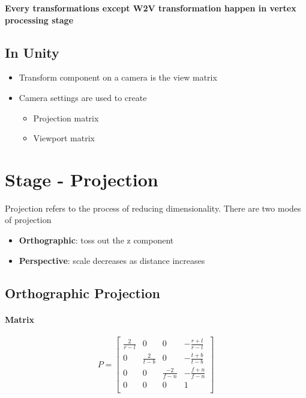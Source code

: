   \textbf{Every transformations except W2V transformation happen in vertex
  processing stage}

  \subsection{In Unity}

    \begin{itemize}
      \item Transform component on a camera is the view matrix
      \item Camera settings are used to create
      \begin{itemize}
        \item Projection matrix
        \item Viewport matrix
      \end{itemize}
    \end{itemize}

\section{Stage - Projection}

  Projection refers to the process of reducing dimensionality. There are two
  modes of projection

  \begin{itemize}
    \item \textbf{Orthographic}: toss out the z component
    \item \textbf{Perspective}: scale decreases as distance increases
  \end{itemize}

  \subsection{Orthographic Projection}

    \paragraph{Matrix}
    \begin{equation}
      P =
      \begin{bmatrix}
        \frac{2}{r - l} & 0 & 0 & -\frac{r + l}{r - l} \\
        0 & \frac{2}{t - b} & 0 & -\frac{t + b}{t - b} \\
        0 & 0 & \frac{-2}{f - n} & -\frac{f + n}{f - n} \\
        0 & 0 & 0 & 1 \\
      \end{bmatrix}
    \end{equation}

